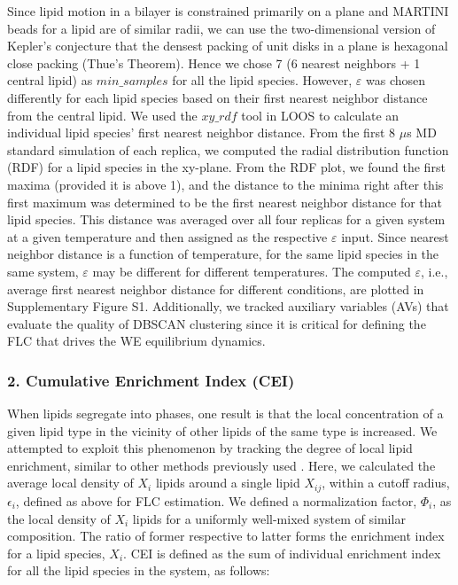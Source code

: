 \documentclass{biophys-new}
\begin{document}
Since lipid motion in a bilayer is constrained primarily on a plane and MARTINI beads for a lipid are of similar radii, we can use the two-dimensional version of Kepler's conjecture that the densest packing of unit disks in a plane is hexagonal close packing (Thue's Theorem).
Hence we chose 7 (6 nearest neighbors + 1 central lipid) as $min\_samples$ for all the lipid species.
However, $\varepsilon$ was chosen differently for each lipid species based on their first nearest neighbor distance from the central lipid.
We used the $xy\_rdf$ tool in LOOS to calculate an individual lipid species' first nearest neighbor distance.
From the first 8 $\mu$s MD standard simulation of each replica, we computed the radial distribution function (RDF) for a lipid species in the xy-plane. 
From the RDF plot, we found the first maxima (provided it is above 1), and the distance to the minima right after this first maximum was determined to be the first nearest neighbor distance for that lipid species.
This distance was averaged over all four replicas for a given system at a given temperature and then assigned as the respective $\varepsilon$ input.
Since nearest neighbor distance is a function of temperature, for the same lipid species in the same system, $\varepsilon$ may be different for different temperatures.
The computed $\varepsilon$, i.e., average first nearest neighbor distance for different conditions, are plotted in Supplementary Figure S1.
Additionally, we tracked auxiliary variables (AVs) that evaluate the quality of DBSCAN clustering since it is critical for defining the FLC that drives the WE equilibrium dynamics.

\subsubsection*{2. Cumulative Enrichment Index (CEI)}

When lipids segregate into phases, one result is that the local concentration of a given lipid type in the vicinity of other lipids of the same type is increased. We attempted to exploit this phenomenon by tracking the degree of local lipid enrichment, similar to other methods previously used \cite{Gu2019, Gu2020}.
Here, we calculated the average local density of $X_i$ lipids around a single lipid $X_{ij}$, within a cutoff radius, $\epsilon_i$, defined as above for FLC estimation.
We defined a normalization factor, $\Phi_i$, as the local density of $X_i$ lipids for a uniformly well-mixed system of similar composition.
The ratio of former respective to latter forms the enrichment index for a lipid species, $X_i$.
CEI is defined as the sum of individual enrichment index for all the lipid species in the system, as follows:
\end{document}
